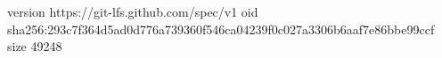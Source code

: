 version https://git-lfs.github.com/spec/v1
oid sha256:293c7f364d5ad0d776a739360f546ca04239f0c027a3306b6aaf7e86bbe99ccf
size 49248
